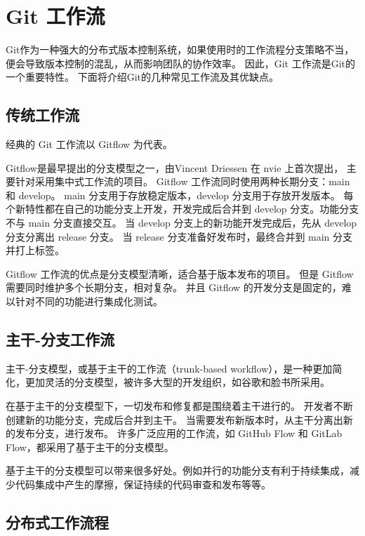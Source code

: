 \documentclass[../main.tex]{subfiles}
\begin{document}
\section{Git 工作流}

Git作为一种强大的分布式版本控制系统，如果使用时的工作流程分支策略不当，便会导致版本控制的混乱，从而影响团队的协作效率。
因此，Git 工作流是Git的一个重要特性。
下面将介绍Git的几种常见工作流及其优缺点。

\subsection{传统工作流}

经典的 Git 工作流以 Gitflow 为代表。

Gitflow是最早提出的分支模型之一，由Vincent Driessen 在 nvie 上首次提出\cite{gitflow}，
主要针对采用集中式工作流的项目。
Gitflow 工作流同时使用两种长期分支：main 和 develop。
main 分支用于存放稳定版本，develop 分支用于存放开发版本。
每个新特性都在自己的功能分支上开发，开发完成后合并到 develop 分支。功能分支不与 main 分支直接交互。
当 develop 分支上的新功能开发完成后，先从 develop 分支分离出 release 分支。
当 release 分支准备好发布时，最终合并到 main 分支并打上标签。

Gitflow 工作流的优点是分支模型清晰，适合基于版本发布的项目。
但是 Gitflow 需要同时维护多个长期分支，相对复杂。
并且 Gitflow 的开发分支是固定的，难以针对不同的功能进行集成化测试。

\subsection{主干-分支工作流}

主干-分支模型，或基于主干的工作流（trunk-based workflow），是一种更加简化，更加灵活的分支模型，被许多大型的开发组织，如谷歌和脸书所采用\cite{trunkbased}。

在基于主干的分支模型下，一切发布和修复都是围绕着主干进行的。
开发者不断创建新的功能分支，完成后合并到主干。
当需要发布新版本时，从主干分离出新的发布分支，进行发布。
许多广泛应用的工作流，如 GitHub Flow 和 GitLab Flow，都采用了基于主干的分支模型。

基于主干的分支模型可以带来很多好处。例如并行的功能分支有利于持续集成，减少代码集成中产生的摩擦，保证持续的代码审查和发布等等。

\subsection{分布式工作流程}
\end{document}
